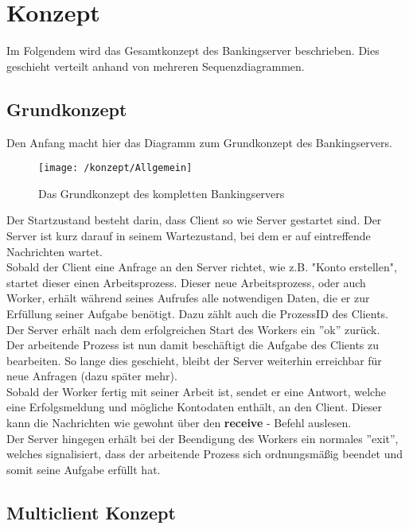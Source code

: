 \section{Konzept}

Im Folgendem wird das Gesamtkonzept des Bankingserver beschrieben. Dies geschieht verteilt anhand von mehreren Sequenzdiagrammen.\\

\subsection{Grundkonzept}

Den Anfang macht hier das Diagramm zum Grundkonzept des Bankingservers.

\begin{figure}
\centering
\texttt{[image: /konzept/Allgemein]}
\caption{Das Grundkonzept des kompletten Bankingservers}
\label{fig:grundkonzept}
\end{figure}

Der Startzustand besteht darin, dass Client so wie Server gestartet sind. Der Server ist kurz darauf in seinem Wartezustand, bei dem er auf eintreffende Nachrichten wartet.\\
Sobald der Client eine Anfrage an den Server richtet, wie z.B. "Konto erstellen", startet dieser einen Arbeitsprozess. Dieser neue Arbeitsprozess, oder auch Worker, erhält während seines Aufrufes alle notwendigen Daten, die er zur Erfüllung seiner Aufgabe benötigt. Dazu zählt auch die ProzessID des Clients.\\
Der Server erhält nach dem erfolgreichen Start des Workers ein ''ok'' zurück.\\
Der arbeitende Prozess ist nun damit beschäftigt die Aufgabe des Clients zu bearbeiten. So lange dies geschieht, bleibt der Server weiterhin erreichbar für neue Anfragen (dazu später mehr).\\
Sobald der Worker fertig mit seiner Arbeit ist, sendet er eine Antwort, welche eine Erfolgsmeldung und mögliche Kontodaten enthält, an den Client. Dieser kann die Nachrichten wie gewohnt über den \textbf{receive} - Befehl auslesen.\\
Der Server hingegen erhält bei der Beendigung des Workers ein normales ''exit'', welches signalisiert, dass der arbeitende Prozess sich ordnungsmäßig beendet und somit seine Aufgabe erfüllt hat.

\subsection{Multiclient Konzept}

